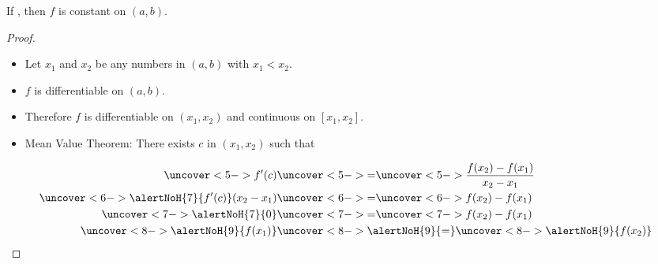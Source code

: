 \begin{frame}
\begin{theorem}
If , then $f$ is constant on $(a,b)$.
\end{theorem}
\begin{proof}
\begin{itemize}
\item<2-| alert@9>  Let $x_1$ and $x_2$ be any numbers in $(a,b)$ with $x_1 < x_2$.
\item<3->  $f$ is differentiable on $(a,b)$.
\item<4->  Therefore $f$ is differentiable on $(x_1, x_2)$ and continuous on $[x_1, x_2]$.
\item<5->  Mean Value Theorem: There exists $c$ in $(x_1, x_2)$ such that
\end{itemize}
\abovedisplayskip=0pt
\belowdisplayskip=0pt
\abovedisplayshortskip=0pt
\belowdisplayshortskip=0pt
\begin{align*}
\uncover<5->{%
f'(c)%
}%
& \uncover<5->{ = } %
\uncover<5->{%
\frac{f(x_2)-f(x_1)}{x_2-x_1}%
}\\%
\uncover<6->{%
\alertNoH{ 7}{f'(c)}(x_2-x_1)%
}%
& \uncover<6->{ = } %
\uncover<6->{%
f(x_2)-f(x_1)%
}\\%
\uncover<7->{%
\alertNoH{ 7}{0}%
}%
& \uncover<7->{ = } %
\uncover<7->{%
f(x_2)-f(x_1)%
}\\%
\uncover<8->{%
\alertNoH{ 9}{f(x_1)}%
}%
& \uncover<8->{\alertNoH{ 9}{ = }} %
\uncover<8->{%
\alertNoH{ 9}{f(x_2)}%
}%
\end{align*}
%
\end{proof}
\end{frame}
